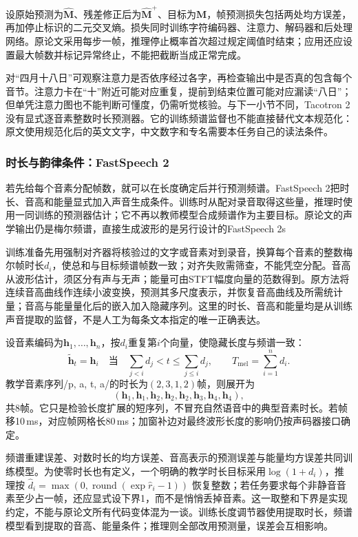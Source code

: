 设原始预测为$\widehat{\bm{M}}$、残差修正后为$\widehat{\bm{M}}^{+}$、目标为$\bm{M}$，帧预测损失包括两处均方误差，再加停止标识的二元交叉熵。损失同时训练字符编码器、注意力、解码器和后处理网络。原论文采用每步一帧，推理停止概率首次超过规定阈值时结束；应用还应设置最大帧数并标记异常终止，不能把截断当成正常完成。

对“四月十八日”可观察注意力是否依序经过各字，再检查输出中是否真的包含每个音节。注意力卡在“十”附近可能对应重复，提前到结束位置可能对应漏读“八日”；但单凭注意力图也不能判断可懂度，仍需听觉核验。与下一小节不同，Tacotron 2没有显式逐音素整数时长预测器。它的训练频谱监督也不能直接替代文本规范化：原文使用规范化后的英文文字，中文数字和专名需要本任务自己的读法条件。

\subsubsection{时长与韵律条件：FastSpeech 2}
\label{sec:nlp-speech-fastspeech}

若先给每个音素分配帧数，就可以在长度确定后并行预测频谱。FastSpeech 2把时长、音高和能量显式加入声音生成条件。训练时从配对录音取得这些量，推理时使用一同训练的预测器估计；它不再以教师模型合成频谱作为主要目标。原论文的声学输出仍是梅尔频谱，直接生成波形的是另行设计的FastSpeech 2s

训练准备先用强制对齐器将核验过的文字或音素对到录音，换算每个音素的整数梅尔帧时长$d_i$，使总和与目标频谱帧数一致；对齐失败需筛查，不能凭空分配。音高从波形估计，须区分有声与无声；能量可由STFT幅度向量的范数得到。原方法将连续音高曲线作连续小波变换，预测其多尺度表示，并恢复音高曲线及所需统计量；音高与能量量化后的嵌入加入隐藏序列。这里的时长、音高和能量均是从训练声音提取的监督，不是人工为每条文本指定的唯一正确表达。

设音素编码为$\bm{h}_1,\ldots,\bm{h}_n$，按$d_i$重复第$i$个向量，使隐藏长度与频谱一致：
\begin{equation}
 \widetilde{\bm{h}}_t=\bm{h}_i
 \quad\text{当}\quad
 \sum_{j<i}d_j<t\leq\sum_{j\leq i}d_j,
 \qquad T_{\mathrm{mel}}=\sum_{i=1}^{n}d_i.
 \label{eq:nlp-speech-length-regulator}
\end{equation}
教学音素序列/p, a, t, a/的时长为$(2,3,1,2)$帧，则展开为
\[
 (\bm{h}_1,\bm{h}_1,\bm{h}_2,\bm{h}_2,
  \bm{h}_2,\bm{h}_3,\bm{h}_4,\bm{h}_4),
\]
共8帧。它只是检验长度扩展的短序列，不冒充自然语音中的典型音素时长。若帧移10\,ms，对应帧网格长80\,ms；加窗补边对最终波形长度的影响仍按声码器接口确定。

频谱重建误差、对数时长的均方误差、音高表示的预测误差与能量均方误差共同训练模型。为使零时长也有定义，一个明确的教学时长目标采用$\log(1+d_i)$，推理按
$\hat d_i=\max(0,\operatorname{round}(\exp\hat r_i-1))$
恢复整数；若任务要求每个非静音音素至少占一帧，还应显式设下界1，而不是悄悄丢掉音素。这一取整和下界是实现约定，不能与原论文所有代码变体混为一谈。训练长度调节器使用提取时长，频谱模型看到提取的音高、能量条件；推理则全部改用预测量，误差会互相影响。

